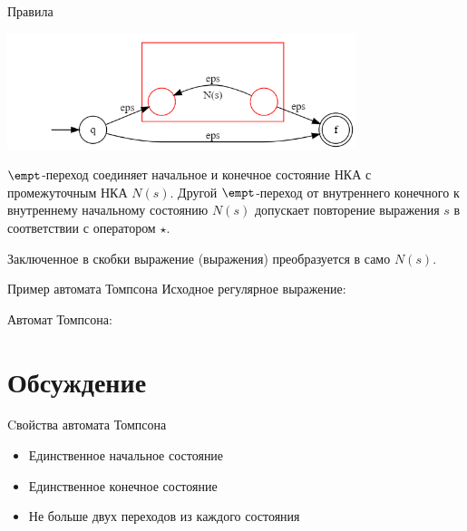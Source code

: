 \begin{frame}{Правила}
{        \includegraphics[width=4in, keepaspectratio]{tompson_rule5.png} %

        $\empt$-переход соединяет начальное и конечное состояние НКА с промежуточным НКА $N(s)$. Другой $\empt$-переход от внутреннего конечного к внутреннему начальному состоянию $N(s)$ допускает повторение выражения $s$ в соответствии с оператором $\star$.

        Заключенное в скобки выражение (выражения) преобразуется в само $N(s)$.
    }
\end{frame}%

\begin{frame}{Пример автомата Томпсона}
    Исходное регулярное выражение:

    Автомат Томпсона:

\end{frame}

\section{Обсуждение}
\begin{frame}{Cвойства автомата Томпсона}
    \begin{itemize}
        \item Единственное начальное состояние
        \item Единственное конечное состояние
        \item Не больше двух переходов из каждого состояния
    \end{itemize}
\end{frame}